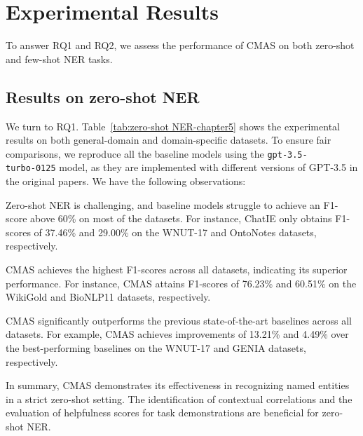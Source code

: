 \section{Experimental Results}
\label{sec:results-chapter5}
To answer RQ1 and RQ2, we assess the performance of \ac{CMAS} on both zero-shot and few-shot NER tasks.

\subsection{Results on zero-shot NER}
\label{subsec:zero-shot results-chapter5}
We turn to RQ1. Table~\ref{tab:zero-shot NER-chapter5} shows the experimental results on both general-domain and domain-specific datasets. To ensure fair comparisons, we reproduce all the baseline models using the \texttt{gpt-3.5-\\turbo-0125} model, as they are implemented with different versions of GPT-3.5 in the original papers. 
We have the following observations:
\begin{enumerate*}[label=(\roman*),nosep,leftmargin=*]
    \item Zero-shot \ac{NER} is challenging, and baseline models struggle to achieve an F1-score above 60\% on most of the datasets. For instance, ChatIE only obtains F1-scores of 37.46\% and 29.00\% on the WNUT-17 and OntoNotes datasets, respectively.
    \item \ac{CMAS} achieves the highest F1-scores across all datasets, indicating its superior performance. For instance, \ac{CMAS} attains F1-scores of 76.23\% and 60.51\% on the WikiGold and BioNLP11 datasets, respectively.
    \item \ac{CMAS} significantly outperforms the previous state-of-the-art baselines across all datasets. For example, \ac{CMAS} achieves improvements of 13.21\% and 4.49\% over the best-performing baselines on the WNUT-17 and GENIA datasets, respectively.
\end{enumerate*}

In summary, \ac{CMAS} demonstrates its effectiveness in recognizing named entities in a strict zero-shot setting. The identification of contextual correlations and the evaluation of helpfulness scores for task demonstrations are beneficial for zero-shot \ac{NER}.


